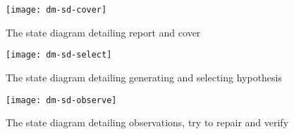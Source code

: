 \begin{figure}[htbp]
    \centering
    \texttt{[image: dm-sd-cover]}
    \caption{The state diagram detailing report and cover}
    \label{fig:dm:sd cover}
\end{figure}

\begin{figure}[htbp]
    \centering
    \texttt{[image: dm-sd-select]}
    \caption{The state diagram detailing generating and selecting hypothesis}
    \label{fig:dm:sd select}
\end{figure}

\begin{figure}[htbp]
    \centering
    \texttt{[image: dm-sd-observe]}
    \caption{The state diagram detailing observations, try to repair and verify}
    \label{fig:dm:sd observe}
\end{figure}
